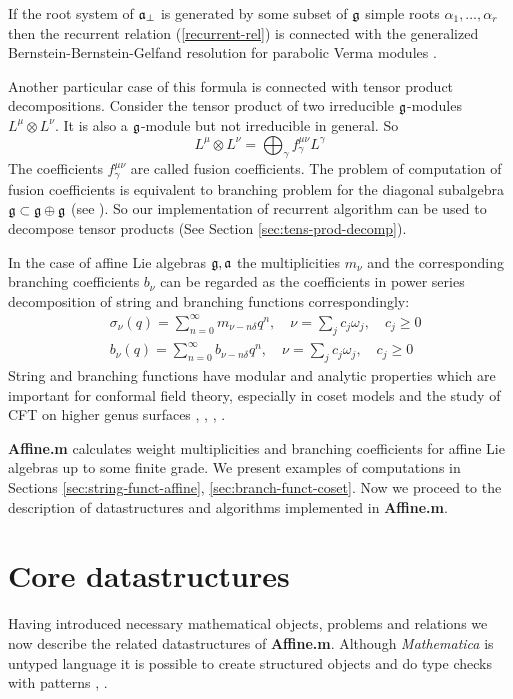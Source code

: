 If the root system of $\mathfrak{a}_{\bot}$ is generated by some subset of $\mathfrak{g}$
simple roots $\alpha_{1},\dots,\alpha_{r}$ then the recurrent
relation (\ref{recurrent-rel}) is connected with the generalized
Bernstein-Bernstein-Gelfand resolution for parabolic Verma modules
\cite{2011arXiv1102.1702L}.

Another particular case of this formula is connected with tensor
product decompositions. Consider the tensor product of two
irreducible $\mathfrak{g}$-modules $L^{\mu}\otimes L^{\nu}$. It is also a
$\mathfrak{g}$-module but not irreducible in general. So
\begin{equation}
  \label{eq:19}
  L^{\mu}\otimes L^{\nu}=\bigoplus_{\gamma} f^{\mu\nu}_{\gamma}L^{\gamma}
\end{equation}
The coefficients $f^{\mu\nu}_{\gamma}$ are called fusion
coefficients. The problem of computation of fusion coefficients is
equivalent to branching problem for the diagonal subalgebra
$\mathfrak{g}\subset \mathfrak{g}\oplus \mathfrak{g}$ (see \cite{LyakhovskyPostnova2011}). So our implementation of recurrent algorithm can be used to decompose tensor products (See Section \ref{sec:tens-prod-decomp}).

In the case of affine Lie algebras $\mathfrak{g}, \mathfrak{a}$  the multiplicities
$m_{\nu}$ and the corresponding branching coefficients $b_{\nu}$
can be regarded as the coefficients in power series decomposition
of string and branching functions correspondingly:
\begin{align}
  \label{eq:21}
  &\sigma_{\nu}(q)=\sum_{n=0}^{\infty} m_{\nu-n\delta} q^n, \quad \nu=\sum_j c_j \omega_j,\quad c_j\geq 0\\
  & b_{\nu}(q)=\sum_{n=0}^{\infty} b_{\nu-n\delta} q^n,\quad  \nu=\sum_j c_j \omega_j, \quad c_j\geq 0
\end{align}
String and branching functions have  modular and analytic properties which are important for conformal field theory, especially in  coset models and the study of CFT on higher genus surfaces \cite{kac1988modular}, \cite{difrancesco1997cft}, \cite{Walton:1999xc}, \cite{walton1989conformal}.


{\bf Affine.m}  calculates weight multiplicities and branching coefficients for affine Lie algebras up to some finite grade. We present examples of computations in Sections \ref{sec:string-funct-affine}, \ref{sec:branch-funct-coset}. Now we proceed to the description of datastructures and algorithms implemented in {\bf Affine.m}.

\section{Core datastructures}
\label{sec:core-datastructures} Having introduced necessary
mathematical objects, problems and relations we now describe the
related datastructures of {\bf Affine.m}. Although {\it
Mathematica} is untyped language it is possible to create
structured objects and do type checks with patterns
\cite{shifrinmathematica}, \cite{maeder2000computer}.
